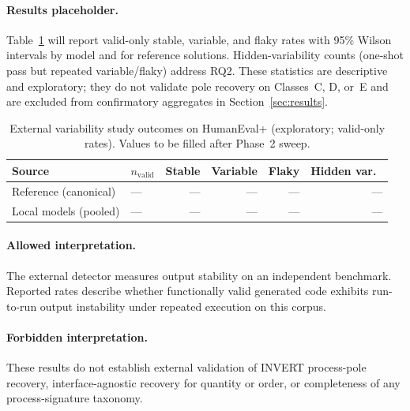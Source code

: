 \paragraph{Results placeholder.}
Table~\ref{tab:app:external-variability} will report valid-only stable, variable, and flaky rates with 95\% Wilson intervals by model and for reference solutions.
Hidden-variability counts (one-shot pass but repeated variable/flaky) address RQ2.
These statistics are descriptive and exploratory; they do not validate pole recovery on Classes~C, D, or~E and are excluded from confirmatory aggregates in Section~\ref{sec:results}.

\begin{table}[H]
  \caption{External variability study outcomes on HumanEval+ (exploratory; valid-only rates). Values to be filled after Phase~2 sweep.}
  \label{tab:app:external-variability}
  \small
  \begin{tabular}{@{}llrrrr@{}}
    \toprule
    Source & $n_{\mathrm{valid}}$ & Stable & Variable & Flaky & Hidden var.\ \\
    \midrule
    Reference (canonical) & --- & --- & --- & --- & --- \\
    Local models (pooled) & --- & --- & --- & --- & --- \\
    \bottomrule
  \end{tabular}
\end{table}

\paragraph{Allowed interpretation.}
The external detector measures output stability on an independent benchmark.
Reported rates describe whether functionally valid generated code exhibits run-to-run output instability under repeated execution on this corpus.
\paragraph{Forbidden interpretation.}
These results do not establish external validation of INVERT process-pole recovery, interface-agnostic recovery for quantity or order, or completeness of any process-signature taxonomy.
